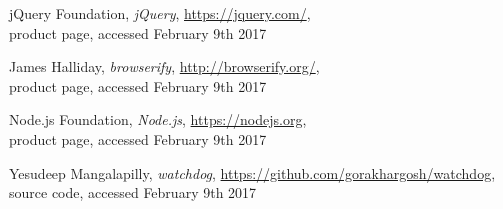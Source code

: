 \documentclass[conference]{IEEEtran}
\begin{document}
\begin{thebibliography}{1}
jQuery Foundation, \emph{jQuery}, \url{https://jquery.com/},\\ product page,
accessed February 9th 2017

James Halliday, \emph{browserify}, \url{http://browserify.org/},\\ product page,
accessed February 9th 2017

Node.js Foundation, \emph{Node.js}, \url{https://nodejs.org},\\ product page,
accessed February 9th 2017

Yesudeep Mangalapilly, \emph{watchdog}, \url{https://github.com/gorakhargosh/watchdog}, \\ source code, accessed February 9th 2017

\end{thebibliography}
\end{document}
